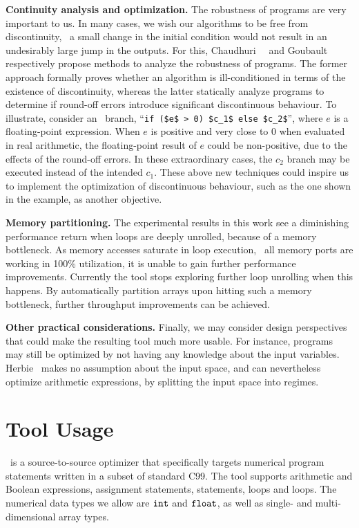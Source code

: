 \textbf{Continuity analysis and optimization.} The robustness of programs
are very important to us.  In many cases, we wish our algorithms to be
free from discontinuity, \ie~a small change in the initial condition
would not result in an undesirably large jump in the outputs.  For this,
Chaudhuri~\etal~\cite{chaudhuri11} and Goubault~\etal~\cite{goubault13}
respectively propose methods to analyze the robustness of programs.  The
former approach formally proves whether an algorithm is ill-conditioned in
terms of the existence of discontinuity, whereas the latter statically analyze
programs to determine if round-off errors introduce significant discontinuous
behaviour.  To illustrate, consider an \iflit~branch,
``\lstinline[basicstyle=\tt]{if ($e$ > 0) $c_1$ else $c_2$}'', where $e$
is a floating-point expression.  When $e$ is positive and very close to
$0$ when evaluated in real arithmetic, the floating-point result of $e$
could be non-positive, due to the effects of the round-off errors.  In
these extraordinary cases, the $c_2$ branch may be executed instead of the
intended $c_1$.  These above new techniques could inspire us to implement the
optimization of discontinuous behaviour, such as the one shown in the example,
as another objective.

\textbf{Memory partitioning.} The experimental results in this work see a
diminishing performance return when loops are deeply unrolled, because of a
memory bottleneck.  As memory accesses saturate in loop execution, \ie~all
memory ports are working in 100\% utilization, it is unable to gain further
performance improvements.  Currently the tool stops exploring further loop
unrolling when this happens.  By automatically partition arrays upon hitting
such a memory bottleneck, further throughput improvements can be achieved.

\textbf{Other practical considerations.}  Finally, we may consider design
perspectives that could make the resulting tool much more usable.  For
instance, programs may still be optimized by not having any knowledge about the
input variables.  Herbie~\cite{panchekha15} makes no assumption about the input
space, and can nevertheless optimize arithmetic expressions, by splitting the
input space into regimes.


\section{Tool Usage}
\label{cc:sec:usage}

\soap~is a source-to-source optimizer that specifically targets numerical
program statements written in a subset of standard C99.  The tool supports
arithmetic and Boolean expressions, assignment statements, \iflit{} statements,
\whilelit{} loops and \forlit{} loops.  The numerical data types we allow are
$\texttt{int}$ and $\texttt{float}$, as well as single- and multi-dimensional array
types.

